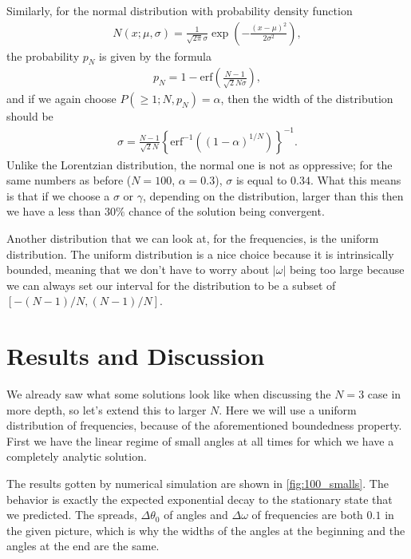 \documentclass[10pt,a4paper,twocolumn]{article}
\begin{document}
Similarly, for the normal distribution with probability density function
%
\begin{align}
    N(x; \mu, \sigma) = \frac{1}{\sqrt{2\pi} \sigma} \exp \left(- \frac{(x - \mu)^2}{2 \sigma^2}\right),
\end{align}
%
the probability $p_N$ is given by the formula
%
\begin{align}
    p_N = 1 - \mathrm{erf} \left(\frac{N - 1}{\sqrt{2} N \sigma}\right),
\end{align}
%
and if we again choose $P(\geq 1; N, p_N) = \alpha$, then the width of the distribution should be
%
\begin{align}
    \sigma = \frac{N - 1}{\sqrt{2}N} \left\lbrace \mathrm{erf}^{-1} \left( (1 - \alpha)^{1/N} \right) \right\rbrace^{-1}.
\end{align}
%
Unlike the Lorentzian distribution, the normal one is not as oppressive; for the same numbers as before ($N = 100$, $\alpha = 0.3$), $\sigma$ is equal to $0.34$. What this means is that if we choose a $\sigma$ or $\gamma$, depending on the distribution, larger than this then we have a less than $30\%$ chance of the solution being convergent.

Another distribution that we can look at, for the frequencies, is the uniform distribution. The uniform distribution is a nice choice because it is intrinsically bounded, meaning that we don't have to worry about $|\omega|$ being too large because we can always set our interval for the distribution to be a subset of $[-(N - 1) / N, (N - 1) / N]$.



\section{Results and Discussion}

We already saw what some solutions look like when discussing the $N=3$ case in more depth, so let's extend this to larger $N$. Here we will use a uniform distribution of frequencies, because of the aforementioned boundedness property. First we have the linear regime of small angles at all times for which we have a completely analytic solution. 

The results gotten by numerical simulation are shown in \cref{fig:100_smalls}. The behavior is exactly the expected exponential decay to the stationary state that we predicted. The spreads, $\Delta \theta_0$ of angles and $\Delta \omega$ of frequencies are both $0.1$ in the given picture, which is why the widths of the angles at the beginning and the angles at the end are the same.
\end{document}
